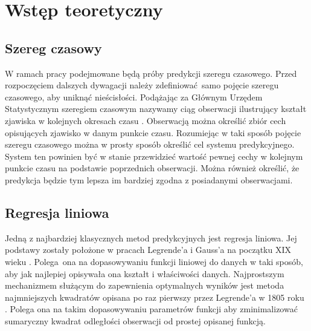 \documentclass[10pt,a4paper]{article}
\begin{document}
\newpage
\section{Wstęp teoretyczny}
\subsection{Szereg czasowy}
W ramach pracy podejmowane będą próby predykcji szeregu czasowego. Przed rozpoczęciem dalszych dywagacji należy zdefiniować samo pojęcie szeregu czasowego, aby uniknąć nieścisłości. Podążając za Głównym Urzędem Statystycznym szeregiem czasowym nazywamy ciąg obserwacji ilustrujący kształt zjawiska w kolejnych okresach czasu \cite{GUS}. Obserwacją można określić zbiór cech opisujących zjawisko w danym punkcie czasu. Rozumiejąc w taki sposób pojęcie szeregu czasowego można w prosty sposób określić cel systemu predykcyjnego. System ten powinien być w stanie przewidzieć wartość pewnej cechy w kolejnym punkcie czasu na podstawie poprzednich obserwacji. Można również określić, że predykcja będzie tym lepsza im bardziej zgodna z posiadanymi obserwacjami. 

\subsection{Regresja liniowa}
Jedną z najbardziej klasycznych metod predykcyjnych jest regresja liniowa. Jej podstawy zostały położone w pracach Legrende'a i Gauss'a na początku XIX wieku \cite{seal1967studies}. Polega ona na dopasowywaniu funkcji liniowej do danych w taki sposób, aby jak najlepiej opisywała ona kształt i właściwości danych. Najprostszym mechanizmem służącym do zapewnienia optymalnych wyników jest metoda najmniejszych kwadratów opisana po raz pierwszy przez Legrende'a w 1805 roku \cite{legendre1806nouvelles}. Polega ona na takim dopasowywaniu parametrów funkcji aby zminimalizować sumaryczny kwadrat odległości obserwacji od prostej opisanej funkcją. 
\end{document}
